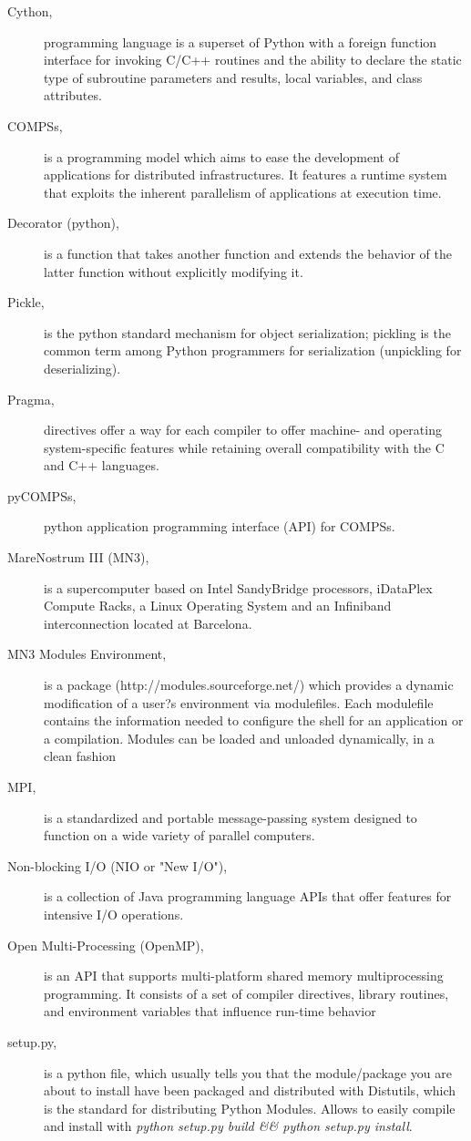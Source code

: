 \begin{description}
\item [Cython,] programming language is a superset of Python with a foreign function interface for invoking C/C++ routines and the ability to declare the static type of subroutine parameters and results, local variables, and class attributes.
\item [COMPSs,] is a programming model which aims to ease the development of applications for distributed infrastructures. It features a runtime system that exploits the inherent parallelism of applications at execution time.
\item [Decorator (python),] is a function that takes another function and extends the behavior of the latter function without explicitly modifying it.
\item [Pickle,] is the python standard mechanism for object serialization; pickling is the common term among Python programmers for serialization (unpickling for deserializing).
\item [Pragma,] directives offer a way for each compiler to offer machine- and operating system-specific features while retaining overall compatibility with the C and C++ languages.
\item[pyCOMPSs,] python application programming interface (API) for COMPSs.
\item  [MareNostrum III (MN3),]  is a supercomputer based on Intel SandyBridge processors, iDataPlex Compute Racks, a Linux Operating System and an Infiniband interconnection located at Barcelona.
\item [MN3 Modules Environment,] is a package (http://modules.sourceforge.net/) which provides a dynamic modification
of a user?s environment via modulefiles. Each modulefile contains the information needed to
configure the shell for an application or a compilation. Modules can be loaded and unloaded dynamically,
in a clean fashion
\item[MPI,] is a standardized and portable message-passing system designed to function on a wide variety of parallel computers.
\item [Non-blocking I/O (NIO or "New I/O"),] is a collection of Java programming language APIs that offer features for intensive I/O operations. 
\item [Open Multi-Processing (OpenMP),] is an API that supports multi-platform shared memory multiprocessing programming. It consists of a set of compiler directives, library routines, and environment variables that influence run-time behavior
\item [setup.py,] is a python file, which usually tells you that the module/package you are about to install have been packaged and distributed with Distutils, which is the standard for distributing Python Modules. Allows to easily compile and install with \textit{python setup.py build \&\& python setup.py install}.

\end{description}

